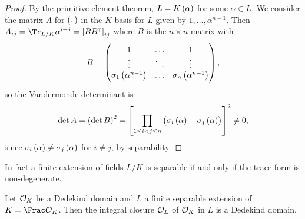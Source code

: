 \begin{proof}
By the primitive element theorem, $ L = K\br{\alpha} $ for some $ \alpha \in L $. We consider the matrix $ A $ for $ \br{,} $ in the $ K $-basis for $ L $ given by $ 1, \dots, \alpha^{n - 1} $. Then $ A_{ij} = \Tr_{L / K} \alpha^{i + j} = \sbr{BB^\intercal}_{ij} $ where $ B $ is the $ n \times n $ matrix with
$$ B = \threebythree{1}{\dots}{1}{\vdots}{\ddots}{\vdots}{\sigma_1\br{\alpha^{n - 1}}}{\dots}{\sigma_n\br{\alpha^{n - 1}}}, $$
so the Vandermonde determinant is
$$ \det A = \br{\det B}^2 = \sbr{\prod_{1 \le i < j \le n} \br{\sigma_i\br{\alpha} - \sigma_j\br{\alpha}}}^2 \ne 0, $$
since $ \sigma_i\br{\alpha} \ne \sigma_j\br{\alpha} $ for $ i \ne j $, by separability.
\end{proof}

\begin{remark*}
In fact a finite extension of fields $ L / K $ is separable if and only if the trace form is non-degenerate.
\end{remark*}

\begin{theorem}
\label{thm:11.5}
Let $ \mathcal{O}_K $ be a Dedekind domain and $ L $ a finite separable extension of $ K = \Frac \OOO_K $. Then the integral closure $ \mathcal{O}_L $ of $ \mathcal{O}_K $ in $ L $ is a Dedekind domain.
\end{theorem}

